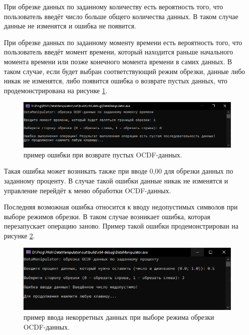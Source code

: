 {  \par При обрезке данных по заданному количеству есть вероятность того, что пользователь введёт число больше общего количества данных. В таком случае данные не изменятся и ошибка не появится. 

  \par При обрезке данных по заданному моменту времени есть вероятность того, что пользователь введёт момент времени, который находится раньше начального момента времени или позже конечного момента времени в самих данных. В таком случае, если будет выбран соответствующий режим обрезки, данные либо никак не изменятся, либо появится ошибка о возврате пустых данных, что продемонстрирована на рисунке \ref{fig:ExOCDFdataCatErr3}.

  \begin{figure}[H]
    \centering
    \includegraphics[width=\textwidth]{images/forDataManipulator/ExOCDFdataCatError3.png}
    \caption{пример ошибки при возврате пустых OCDF-данных.} 
    \label{fig:ExOCDFdataCatErr3}
  \end{figure}

  \par Такая ошибка может возникать также при вводе 0,00 для обрезки данных по заданному проценту. В случае такой ошибки данные никак не изменятся и управление перейдёт к меню обработки OCDF-данных.
  
  \par Последняя возможная ошибка относится к вводу недопустимых символов при выборе режимов обрезки. В таком случае возникает ошибка, которая перезапускает операцию заново. Пример такой ошибки продемонстрирован на рисунке \ref{fig:ExOCDFdataCatErr4}.

  \begin{figure}[H]
    \centering
    \includegraphics[width=\textwidth]{images/forDataManipulator/ExOCDFdataCatError4.png}
    \caption{пример ввода некорретных данных при выборе режима обрезки OCDF-данных.} 
    \label{fig:ExOCDFdataCatErr4}
  \end{figure}

  \par
}

